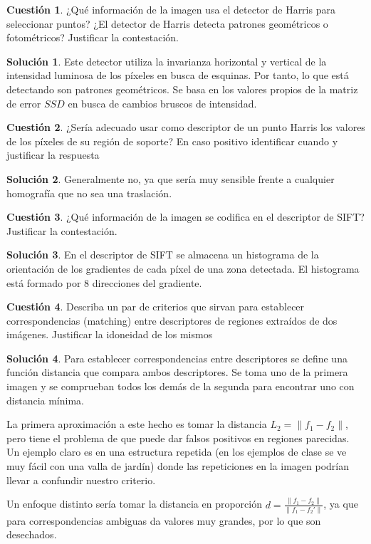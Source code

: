 \documentclass[a4paper, 11pt]{article}
\theoremstyle{definition}
\newtheorem{cuestion}{Cuestión}
\newtheorem*{solucion}{Solución}
\begin{document}
  \begin{cuestion}
    ¿Qué información de la imagen usa el detector de Harris para seleccionar
    puntos? ¿El detector de Harris detecta patrones geométricos o fotométricos?
    Justificar la contestación.
  \end{cuestion}

  \begin{solucion}
     	Este detector utiliza la invarianza horizontal y vertical de la intensidad
      luminosa de los píxeles en busca de esquinas. Por tanto, lo que está detectando son patrones
      geométricos. Se basa en los valores propios de la matriz de error $SSD$ en busca
      de cambios bruscos de intensidad.
  \end{solucion}
  \begin{cuestion}
    ¿Sería adecuado usar como descriptor de un punto Harris los valores de
    los píxeles de su región de soporte? En caso positivo identificar cuando y
    justificar la respuesta
  \end{cuestion}

  \begin{solucion}
     	Generalmente no, ya que sería muy sensible frente a cualquier homografía
      que no sea una traslación.
  \end{solucion}
  \begin{cuestion}
    ¿Qué información de la imagen se codifica en el descriptor de SIFT?
    Justificar la contestación.
  \end{cuestion}

  \begin{solucion}
     	En el descriptor de SIFT se almacena un histograma de la orientación de los
      gradientes de cada píxel de una zona detectada. El histograma está formado
      por 8 direcciones del gradiente.
  \end{solucion}

  \begin{cuestion}
    Describa un par de criterios que sirvan para establecer correspondencias
    (matching) entre descriptores de regiones extraídos de dos imágenes. Justificar
    la idoneidad de los mismos
  \end{cuestion}

  \begin{solucion}
     	Para establecer correspondencias entre descriptores se define una función
      distancia que compara ambos descriptores. Se toma uno de la primera imagen
      y se comprueban todos los demás de la segunda para encontrar uno con distancia mínima.

      La primera aproximación a este hecho es tomar la distancia $L_2=\|f_1-f_2\|$,
      pero tiene el problema de que puede dar falsos positivos en regiones parecidas.
      Un ejemplo claro es en una estructura repetida (en los ejemplos de clase se ve
      muy fácil con una valla de jardín) donde las repeticiones en la imagen podrían
      llevar a confundir nuestro criterio.

      Un enfoque distinto sería tomar la distancia en proporción $d=\frac{\|f_1-f_2\|}{\|f_1-f_2'\|}$,
      ya que para correspondencias ambiguas da valores muy grandes, por lo que son
      desechados.
  \end{solucion}
\end{document}
